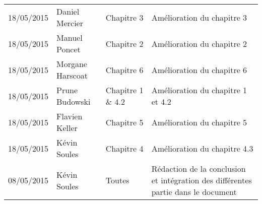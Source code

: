 \small
\begin{tabular}{|p{1.9cm}| >{\raggedright}p{2.5cm}|p{2.5cm}|p{8.5cm}|}
  \hline
  \rowcolor{Gainsboro} \color{Navy}{\bfseries Date}  & \color{Navy}{\bfseries Auteur} & \color{Navy}{\bfseries Section(s)}  &\color{Navy}{\bfseries Commentaires} \\
  \hline
  18/05/2015 & Daniel Mercier & Chapitre 3 & Amélioration du chapitre 3\\
  \hline
  18/05/2015 & Manuel Poncet & Chapitre 2 & Amélioration du chapitre 2\\
  \hline
  18/05/2015 & Morgane Harscoat & Chapitre 6 & Amélioration du chapitre 6\\
  \hline
  18/05/2015 & Prune Budowski & Chapitre 1 \& 4.2 & Amélioration du chapitre 1 et 4.2\\
  \hline
  18/05/2015 & Flavien Keller & Chapitre 5 & Amélioration du chapitre 5\\
  \hline
  18/05/2015 & Kévin Soules & Chapitre 4 & Amélioration du chapitre 4.3\\
  \hline
  08/05/2015 & Kévin Soules & Toutes & Rédaction de la conclusion et intégration des différentes partie dans le document\\
  \hline
\end{tabular}
\normalsize
